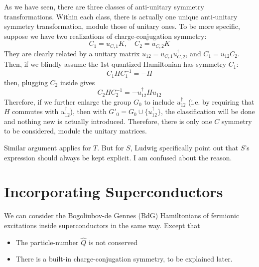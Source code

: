 \documentclass{article}
\begin{document}
As we have seen, there are three classes of anti-unitary symmetry
transformations.
Within each class, there is actually one unique anti-unitary symmetry
transformation, module those of unitary ones. To be more specific,
suppose we have two realizations of charge-conjugation symmetry:
\begin{equation}
    C_1 = u_{C,1} K,\quad C_2=u_{C,2}K
\end{equation}
They are clearly related by a unitary matrix
$u_{12}=u_{C,1}u_{C,2}^\dagger$, and ${C_1=u_{12}C_2}$.
Then, if we blindly assume the 1st-quantized Hamiltonian has symmetry
$C_1$:
\begin{equation}
    C_1 H C_1^{-1} = -H
\end{equation}
then, plugging $C_2$ inside gives
\begin{equation}
    C_2 H C_2^{-1} = - u_{12}^\dagger H u_{12}
\end{equation}
Therefore, if we further enlarge the group $G_0$ to include
$u_{12}^\dagger$ (i.e. by requiring that $H$ commutes with
$u_{12}^\dagger$), then with $G'_0=G_0\cup\{u_{12}^\dagger\}$, the
classification will be done and nothing new is actually introduced.
Therefore, there is only one $C$ symmetry to be considered, module the
unitary matrices.

Similar argument applies for $T$. But for $S$, Ludwig specifically
point out that $S$'s expression should always be kept explicit. I am
confused about the reason. 

\section{Incorporating Superconductors}
\label{sec:Incorporating Superconductors}

We can consider the Bogoliubov-de Gennes (BdG) Hamiltonians of fermionic
excitations inside superconductors in the same way. Except that
\begin{itemize}
    \item The particle-number $\hat{Q}$ is not conserved
    \item There is a built-in charge-conjugation symmetry, to be
        explained later.
\end{itemize}
\end{document}
